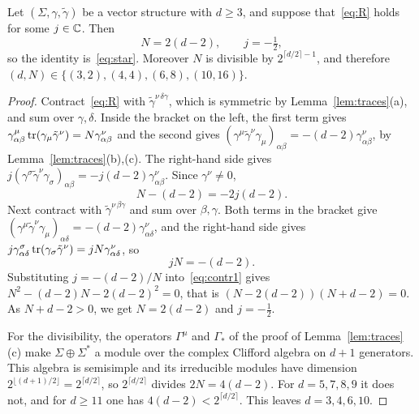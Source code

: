 \begin{theorem}
\label{thm:vector}
Let $(\Sigma,\gamma,\tilde\gamma)$ be a vector structure with $d\ge3$, and suppose that~\eqref{eq:R} holds for some $j\in\mathbb{C}$. Then
\begin{equation}
\label{eq:N}
N=2(d-2),\qquad j=-\tfrac12,
\end{equation}
so the identity is~\eqref{eq:star}. Moreover $N$ is divisible by $2^{\lceil d/2\rceil-1}$, and therefore $(d,N)\in\{(3,2),(4,4),(6,8),(10,16)\}$.
\end{theorem}

\begin{proof}
Contract~\eqref{eq:R} with $\tilde\gamma^{\nu\,\delta\gamma}$, which is symmetric by Lemma~\ref{lem:traces}(a), and sum over $\gamma,\delta$. Inside the bracket on the left, the first term gives $\gamma^\mu_{\alpha\beta}\operatorname{tr}(\gamma_\mu\tilde\gamma^\nu)=N\gamma^\nu_{\alpha\beta}$ and the second gives $(\gamma^\mu\tilde\gamma^\nu\gamma_\mu)_{\alpha\beta}=-(d-2)\gamma^\nu_{\alpha\beta}$, by Lemma~\ref{lem:traces}(b),(c). The right-hand side gives $j(\gamma^\sigma\tilde\gamma^\nu\gamma_\sigma)_{\alpha\beta}=-j(d-2)\gamma^\nu_{\alpha\beta}$. Since $\gamma^\nu\ne0$,
\begin{equation}
\label{eq:contr1}
N-(d-2)=-2j(d-2).
\end{equation}
Next contract with $\tilde\gamma^{\nu\,\beta\gamma}$ and sum over $\beta,\gamma$. Both terms in the bracket give $(\gamma^\mu\tilde\gamma^\nu\gamma_\mu)_{\alpha\delta}=-(d-2)\gamma^\nu_{\alpha\delta}$, and the right-hand side gives $j\gamma^\sigma_{\alpha\delta}\operatorname{tr}(\gamma_\sigma\tilde\gamma^\nu)=jN\gamma^\nu_{\alpha\delta}$, so
\begin{equation}
\label{eq:contr2}
jN=-(d-2).
\end{equation}
Substituting $j=-(d-2)/N$ into~\eqref{eq:contr1} gives $N^2-(d-2)N-2(d-2)^2=0$, that is $(N-2(d-2))(N+d-2)=0$. As $N+d-2>0$, we get $N=2(d-2)$ and $j=-\frac12$.

For the divisibility, the operators $\Gamma^\mu$ and $\Gamma_*$ of the proof of Lemma~\ref{lem:traces}(c) make $\Sigma\oplus\Sigma^*$ a module over the complex Clifford algebra on $d+1$ generators. This algebra is semisimple and its irreducible modules have dimension $2^{\lfloor(d+1)/2\rfloor}=2^{\lceil d/2\rceil}$, so $2^{\lceil d/2\rceil}$ divides $2N=4(d-2)$. For $d=5,7,8,9$ it does not, and for $d\ge11$ one has $4(d-2)<2^{\lceil d/2\rceil}$. This leaves $d=3,4,6,10$.
\end{proof}

